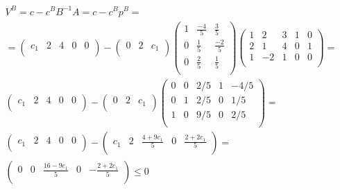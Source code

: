 \begin{enumerate}
    \begin{equation}
    \begin{split}
    V^B = c-c^BB^{-1}A = c-c^Bp^B = \\
    = \begin{pmatrix}
    c_1 & 2 & 4 & 0 & 0\\
    \end{pmatrix}
     - \begin{pmatrix}
    0 & 2 & c_1\\
    \end{pmatrix}
    \begin{pmatrix}
    1 & \frac{-4}{5} & \frac{3}{5}\\
    0 & \frac{1}{5} & \frac{-2}{5}\\
    0 & \frac{2}{5} & \frac{1}{5}\\
    \end{pmatrix}
    \begin{pmatrix}
    1 & 2 & 3 & 1 & 0\\
    2 & 1 & 4 & 0 & 1\\
    1 & -2 & 1 & 0 & 0\\
    \end{pmatrix}
     = \\
     \begin{pmatrix}
    c_1 & 2 & 4 & 0 & 0\\
    \end{pmatrix}
     - \begin{pmatrix}
    0 & 2 & c_1\\
    \end{pmatrix}
    \begin{pmatrix}
    0 & 0 & 2/5 & 1 & -4/5\\
    0 & 1 & 2/5 & 0 & 1/5\\
    1 & 0 & 9/5 & 0 & 2/5\\
    \end{pmatrix} 
    = \\
     \begin{pmatrix}
    c_1 & 2 & 4 & 0 & 0\\
    \end{pmatrix}
    -
     \begin{pmatrix}
     c_1 &  2 & \frac{4+9c_1}{5} & 0 & \frac{2+2c_1}{5}  \\
    \end{pmatrix} = \\
     \begin{pmatrix}
     0 &  0 & \frac{16-9c_1}{5} & 0 & -\frac{2+2c_1}{5} \\
    \end{pmatrix}
     \leq 0
    \end{split}
    \end{equation}


\end{enumerate}
